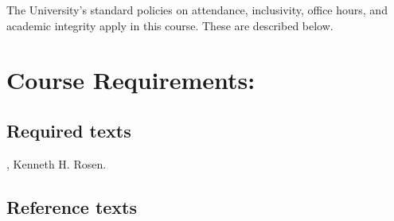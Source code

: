 \documentclass[a4paper]{article}
\begin{document}
The University's standard policies on attendance, inclusivity, office hours, and academic integrity apply in this course. These are described below.



\section{Course Requirements:}


\subsection*{Required texts}
  
, Kenneth H. Rosen.

\subsection*{Reference texts}
  
\end{document}
